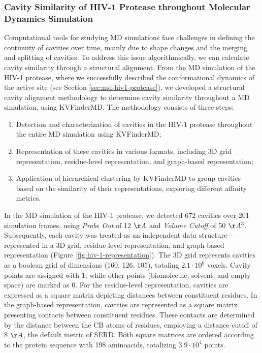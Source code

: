 \documentclass[Ingles]{phdthesis}
\begin{document}
\subsubsection{Cavity Similarity of HIV-1 Protease throughout Molecular Dynamics Simulation}

Computational tools for studying \acs{MD} simulations face challenges in defining the continuity of cavities over time, mainly due to shape changes and the merging and splitting of cavities. To address this issue algorithmically, we can calculate cavity similarity through a structural alignment. From the \acs{MD} simulation of the \acs{HIV-1} protease, where we successfully described the conformational dynamics of the active site (see Section \ref{sec:md-hiv1-protease}), we developed a structural cavity alignment methodology to determine cavity similarity throughout a \acs{MD} simulation, using KVFinderMD. The methodology consists of three steps:

\begin{enumerate}
  \item Detection and characterization of cavities in the \acs{HIV-1} protease throughout the entire \acs{MD} simulation using KVFinderMD;
  \item Representation of these cavities in various formats, including 3D grid representation, residue-level representation, and graph-based representation;
  \item Application of hierarchical clustering by KVFinderMD to group cavities based on the similarity of their representations, exploring different affinity metrics.
\end{enumerate} 

In the \acs{MD} simulation of the \acs{HIV-1} protease, we detected 672 cavities over 201 simulation frames, using \textit{Probe Out} of 12 $\AA$ and \textit{Volume Cutoff} of 50 $\AA^3$. Subsequently, each cavity was treated as an independent data structure---represented in a 3D grid, residue-level representation, and graph-based representation (Figure \ref{fig:hiv-1-representation}). The 3D grid represents cavities as a boolean grid of dimensions (160, 126, 105), totaling $2.1 \cdot 10^6$ voxels. Cavity points are assigned with 1, while other points (biomolecule, solvent, and empty space) are marked as 0. For the residue-level representation, cavities are expressed as a square matrix depicting distances between constituent residues. In the graph-based representation, cavities are represented as a square matrix presenting contacts between constituent residues. These contacts are determined by the distance between the \acs{CB} atoms of residues, employing a distance cutoff of 8 $\AA$, the default metric of SERD. Both square matrices are ordered according to the protein sequence with 198 aminoacids, totalizing $3.9 \cdot 10^4$ points.
\end{document}
